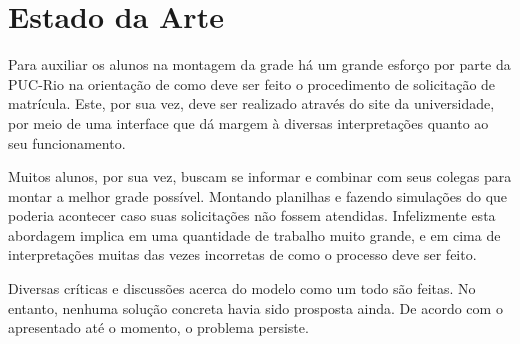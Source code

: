 
\chapter{Estado da Arte}

Para auxiliar os alunos na montagem da grade há um grande esforço por parte da PUC-Rio na orientação de como deve ser feito o procedimento de solicitação de matrícula. Este, por sua vez, deve ser realizado através do site da universidade, por meio de uma interface que dá margem à diversas interpretações quanto ao seu funcionamento.

Muitos alunos, por sua vez, buscam se informar e combinar com seus colegas para montar a melhor grade possível. Montando planilhas e fazendo simulações do que poderia acontecer caso suas solicitações não fossem atendidas. Infelizmente esta abordagem implica em uma quantidade de trabalho muito grande, e em cima de interpretações muitas das vezes incorretas de como o processo deve ser feito.

Diversas críticas e discussões acerca do modelo como um todo são feitas. No entanto, nenhuma solução concreta havia sido prosposta ainda. De acordo com o apresentado até o momento, o problema persiste.
